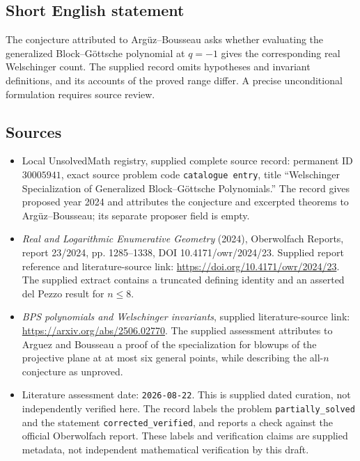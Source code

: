 \documentclass[11pt]{article}
\begin{document}
\subsection{Short English statement}
The conjecture attributed to Argüz--Bousseau asks whether evaluating the generalized Block--Göttsche polynomial at \(q=-1\) gives the corresponding real Welschinger count. The supplied record omits hypotheses and invariant definitions, and its accounts of the proved range differ. A precise unconditional formulation requires source review.
\subsection{Sources}
\begin{itemize}
\item Local UnsolvedMath registry, supplied complete source record: permanent ID \(30005941\), exact source problem code \texttt{catalogue entry}, title ``Welschinger Specialization of Generalized Block--Göttsche Polynomials.'' The record gives proposed year 2024 and attributes the conjecture and excerpted theorems to Argüz--Bousseau; its separate proposer field is empty.
\item \emph{Real and Logarithmic Enumerative Geometry} (2024), Oberwolfach Reports, report 23/2024, pp. 1285--1338, DOI 10.4171/owr/2024/23. Supplied report reference and literature-source link: \url{https://doi.org/10.4171/owr/2024/23}. The supplied extract contains a truncated defining identity and an asserted del Pezzo result for \(n\leq8\).
\item \emph{BPS polynomials and Welschinger invariants}, supplied literature-source link: \url{https://arxiv.org/abs/2506.02770}. The supplied assessment attributes to Arguez and Bousseau a proof of the specialization for blowups of the projective plane at at most six general points, while describing the all-\(n\) conjecture as unproved.
\item Literature assessment date: \texttt{2026-08-22}. This is supplied dated curation, not independently verified here. The record labels the problem \texttt{partially\_solved} and the statement \texttt{corrected\_verified}, and reports a check against the official Oberwolfach report. These labels and verification claims are supplied metadata, not independent mathematical verification by this draft.
\end{itemize}
\end{document}
